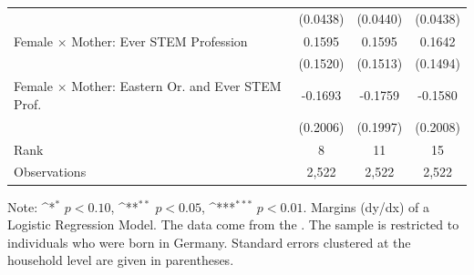 \documentclass[a4paper, oneside, hyperfootnotes = false]{article}
\def\sym#1{\ifmmode^{#1}\else\(^{#1}\)\fi}
\begin{document}
{\begin{table}[ht]
\begin{center}
\begin{tabular}{l*{3}{c}}
			&    (0.0438)         &    (0.0440)         &    (0.0438)         \\
			\addlinespace
			Female $\times$ Mother: Ever STEM Profession&      0.1595         &      0.1595         &      0.1642         \\
			&    (0.1520)         &    (0.1513)         &    (0.1494)         \\
			\addlinespace
			Female $\times$ Mother: Eastern Or. and Ever STEM Prof. &     -0.1693         &     -0.1759         &     -0.1580         \\
			&    (0.2006)         &    (0.1997)         &    (0.2008)         \\
			\midrule
			Rank                &      8         &     11         &     15         \\
			Observations                   &   2,522         &   2,522         &   2,522         \\
			\bottomrule
		\end{tabular}
		
		\vspace{2mm}
		
		\parbox{10cm}{
			\linespread{1}\footnotesize Note: \sym{*} \(p<0.10\), \sym{**} \(p<0.05\), \sym{***} \(p<0.01\). Margins (dy/dx) of a Logistic Regression Model. The data come from the \cite{SOEP2023}. The sample is restricted to individuals who were born in Germany. Standard errors clustered at the household level are given in parentheses.}
		
	\end{center}
\end{table}

}
\end{document}

